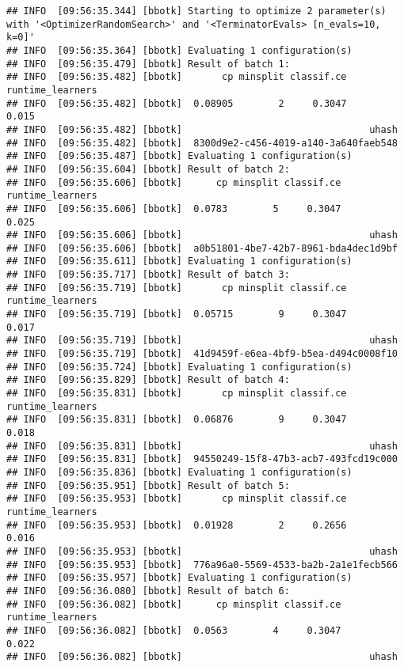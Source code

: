 \documentclass[
]{scrbook}
\begin{document}
\begin{verbatim}
## INFO  [09:56:35.344] [bbotk] Starting to optimize 2 parameter(s) with '<OptimizerRandomSearch>' and '<TerminatorEvals> [n_evals=10, k=0]' 
## INFO  [09:56:35.364] [bbotk] Evaluating 1 configuration(s) 
## INFO  [09:56:35.479] [bbotk] Result of batch 1: 
## INFO  [09:56:35.482] [bbotk]       cp minsplit classif.ce runtime_learners 
## INFO  [09:56:35.482] [bbotk]  0.08905        2     0.3047            0.015 
## INFO  [09:56:35.482] [bbotk]                                 uhash 
## INFO  [09:56:35.482] [bbotk]  8300d9e2-c456-4019-a140-3a640faeb548 
## INFO  [09:56:35.487] [bbotk] Evaluating 1 configuration(s) 
## INFO  [09:56:35.604] [bbotk] Result of batch 2: 
## INFO  [09:56:35.606] [bbotk]      cp minsplit classif.ce runtime_learners 
## INFO  [09:56:35.606] [bbotk]  0.0783        5     0.3047            0.025 
## INFO  [09:56:35.606] [bbotk]                                 uhash 
## INFO  [09:56:35.606] [bbotk]  a0b51801-4be7-42b7-8961-bda4dec1d9bf 
## INFO  [09:56:35.611] [bbotk] Evaluating 1 configuration(s) 
## INFO  [09:56:35.717] [bbotk] Result of batch 3: 
## INFO  [09:56:35.719] [bbotk]       cp minsplit classif.ce runtime_learners 
## INFO  [09:56:35.719] [bbotk]  0.05715        9     0.3047            0.017 
## INFO  [09:56:35.719] [bbotk]                                 uhash 
## INFO  [09:56:35.719] [bbotk]  41d9459f-e6ea-4bf9-b5ea-d494c0008f10 
## INFO  [09:56:35.724] [bbotk] Evaluating 1 configuration(s) 
## INFO  [09:56:35.829] [bbotk] Result of batch 4: 
## INFO  [09:56:35.831] [bbotk]       cp minsplit classif.ce runtime_learners 
## INFO  [09:56:35.831] [bbotk]  0.06876        9     0.3047            0.018 
## INFO  [09:56:35.831] [bbotk]                                 uhash 
## INFO  [09:56:35.831] [bbotk]  94550249-15f8-47b3-acb7-493fcd19c000 
## INFO  [09:56:35.836] [bbotk] Evaluating 1 configuration(s) 
## INFO  [09:56:35.951] [bbotk] Result of batch 5: 
## INFO  [09:56:35.953] [bbotk]       cp minsplit classif.ce runtime_learners 
## INFO  [09:56:35.953] [bbotk]  0.01928        2     0.2656            0.016 
## INFO  [09:56:35.953] [bbotk]                                 uhash 
## INFO  [09:56:35.953] [bbotk]  776a96a0-5569-4533-ba2b-2a1e1fecb566 
## INFO  [09:56:35.957] [bbotk] Evaluating 1 configuration(s) 
## INFO  [09:56:36.080] [bbotk] Result of batch 6: 
## INFO  [09:56:36.082] [bbotk]      cp minsplit classif.ce runtime_learners 
## INFO  [09:56:36.082] [bbotk]  0.0563        4     0.3047            0.022 
## INFO  [09:56:36.082] [bbotk]                                 uhash 

\end{verbatim}
\end{document}
